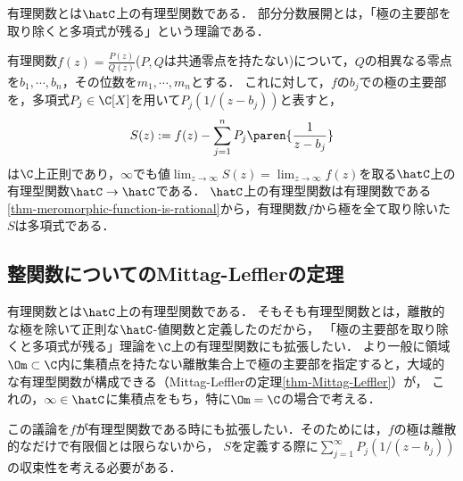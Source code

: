 \documentclass[uplatex, dvipdfmx]{jsreport}
\begin{document}
\begin{tcolorbox}[colframe=ForestGreen, colback=ForestGreen!10!white,breakable,colbacktitle=ForestGreen!40!white,coltitle=black,fonttitle=\bfseries\sffamily,
title=]
    有理関数とは$\hatC$上の有理型関数である．
    部分分数展開とは，「極の主要部を取り除くと多項式が残る」という理論である．
\end{tcolorbox}

\begin{discussion}[有理関数から極の主要部を取り除くと多項式が残ることの証明]
    有理関数$f(z)=\frac{P(z)}{Q(z)}$($P,Q$は共通零点を持たない)について，$Q$の相異なる零点を$b_1,\cdots,b_n$，その位数を$m_1,\cdots,m_n$とする．
    これに対して，$f$の$b_j$での極の主要部を，多項式$P_j\in\C[X]$を用いて$P_j(1/(z-b_j))$と表すと，
    \[S(z):=f(z)-\sum^n_{j=1}P_j\paren{\frac{1}{z-b_j}}\]
    は$\C$上正則であり，$\infty$でも値$\lim_{z\to\infty}S(z)=\lim_{z\to\infty}f(z)$を取る$\hatC$上の有理型関数$\hatC\to\hatC$である．
    $\hatC$上の有理型関数は有理関数である\ref{thm-meromorphic-function-is-rational}から，有理関数$f$から極を全て取り除いた$S$は多項式である．
\end{discussion}

\subsection{整関数についてのMittag-Lefflerの定理}

\begin{tcolorbox}[colframe=ForestGreen, colback=ForestGreen!10!white,breakable,colbacktitle=ForestGreen!40!white,coltitle=black,fonttitle=\bfseries\sffamily,
title=]
    有理関数とは$\hatC$上の有理型関数である．
    そもそも有理型関数とは，離散的な極を除いて正則な$\hatC$-値関数と定義したのだから，
    「極の主要部を取り除くと多項式が残る」理論を$\C$上の有理型関数にも拡張したい．
    より一般に領域$\Om\subset\C$内に集積点を持たない離散集合上で極の主要部を指定すると，大域的な有理型関数が構成できる（Mittag-Lefflerの定理\ref{thm-Mittag-Leffler}）が，
    これの，$\infty\in\hatC$に集積点をもち，特に$\Om=\C$の場合で考える．
\end{tcolorbox}

\begin{screen}
    この議論を$f$が有理型関数である時にも拡張したい．そのためには，$f$の極は離散的なだけで有限個とは限らないから，
    $S$を定義する際に$\sum^\infty_{j=1}P_j(1/(z-b_j))$の収束性を考える必要がある．
\end{screen}
\end{document}
